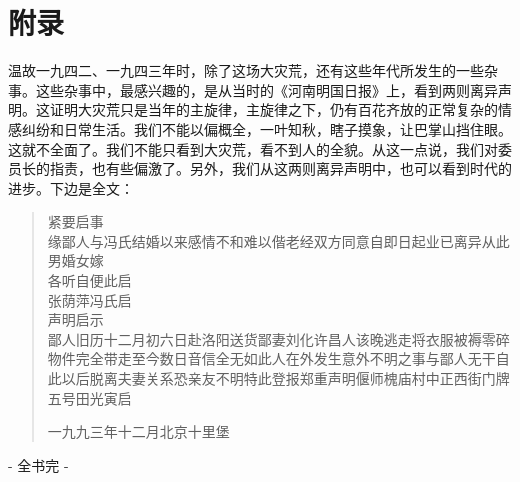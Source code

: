 \fancyhead[RO]{\thepage} %
\fancyhead[LE]{\thepage} %
\fancyfoot[LE,RO]{}
\fancyfoot[LO,CE]{}
\fancyfoot[CO,RE]{}
\chapter*{附录}
温故一九四二、一九四三年时，除了这场大灾荒，还有这些年代所发生的一些杂事。这些杂事中，最感兴趣的，是从当时的《河南明国日报》上，看到两则离异声明。这证明大灾荒只是当年的主旋律，主旋律之下，仍有百花齐放的正常复杂的情感纠纷和日常生活。我们不能以偏概全，一叶知秋，瞎子摸象，让巴掌山挡住眼。这就不全面了。我们不能只看到大灾荒，看不到人的全貌。从这一点说，我们对委员长的指责，也有些偏激了。另外，我们从这两则离异声明中，也可以看到时代的进步。下边是全文：\\

\begin{quote}
	紧要启事\\

缘鄙人与冯氏结婚以来感情不和难以偕老经双方同意自即日起业已离异从此男婚女嫁\\

各听自便此启\\

张荫萍冯氏启\\

声明启示\\

鄙人旧历十二月初六日赴洛阳送货鄙妻刘化许昌人该晚逃走将衣服被褥零碎物件完全带走至今数日音信全无如此人在外发生意外不明之事与鄙人无干自此以后脱离夫妻关系恐亲友不明特此登报郑重声明偃师槐庙村中正西街门牌五号田光寅启\\

\begin{flushright}
	一九九三年十二月北京十里堡\\
\end{flushright}
\end{quote}

\begin{center}
	- 全书完 -
\end{center}